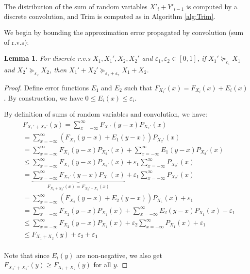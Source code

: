 \documentclass{article}
\newtheorem{lemma}{Lemma}
\begin{document}
The distribution of the sum of random variables $X'_i + Y'_{i-1}$ is 
computed by a discrete convolution, and Trim is computed as in Algorithm \ref{alg:Trim}.

We begin by bounding the approximation error propagated by convolution (sum of r.v.s):

\begin{lemma} \label{Convolv}
For discrete r.v.s $X_1,X_1',X_2,X_2'$ and $\varepsilon_1,\varepsilon_2 \in [0,1]$, 
if $X_1'\succeq_{\varepsilon_1} X_1$ and  $X_2'\succeq_{\varepsilon_2} X_2$,
then $X_1'+X_2'\succeq_{\varepsilon_1+\varepsilon_2} X_1+X_2$.
\end{lemma}

\begin{proof}
Define error functions $E_1$ and $E_2$ such that 
$F_{X_i'}(x) = F_{X_i}(x)+ E_i(x)$. By construction, we have $ 0 \leq E_i(x) \leq \varepsilon_i$.

By definition of sums of random variables and convolution, we have:
\begin{align*}
& F_{X_1'+X_2'}(y) = \sum_{x=-\infty}^{\infty}F_{X_1'}(y-x)P_{X_2'}(x)\\
&=\sum_{x=-\infty}^{\infty}(F_{X_1}(y-x)+E_1(y-x))P_{X_2'}(x)\\
&= \sum_{x=-\infty}^{\infty}F_{X_1}(y-x)P_{X_2'}(x)+\sum_{x=-\infty}^{\infty}E_1(y-x)P_{X_2'}(x)\\
&\leq\sum_{x=-\infty}^{\infty}F_{X_1}(y-x)P_{X_2'}(x)+\varepsilon_1\sum_{x=-\infty}^{\infty}P_{X_2'}(x)\\
&=\underbrace{\sum_{x=-\infty}^{\infty}F_{X_2'}(y-x)P_{X_1}(x)}_{F_{X_1+X_2'}(x)=F_{X_2'+X_1}(x)}+\varepsilon_1\sum_{x=-\infty}^{\infty}P_{X_2'}(x)\\
&=\sum_{x=-\infty}^{\infty}(F_{X_2}(y-x)+E_2(y-x))P_{X_1}(x) + \varepsilon_1\\
&=\sum_{x=-\infty}^{\infty}F_{X_2}(y-x)P_{X_1}(x)+\sum_{x=-\infty}^{\infty}E_2(y-x)P_{X_1}(x) + \varepsilon_1\\
&\leq\sum_{x=-\infty}^{\infty}F_{X_2}(y-x)P_{X_1}(x)+\varepsilon_2\sum_{x=-\infty}^{\infty}P_{X_1}(x) + \varepsilon_1\\
&\leq F_{X_1+X_2}(y)+\varepsilon_2 + \varepsilon_1\\
\end{align*}

Note that since $E_i(y)$ are non-negative, we also get $F_{X_1'+X_2'}(y) \geq F_{X_1+X_2}(y)$ for all $y$.

\end{proof}
\end{document}
